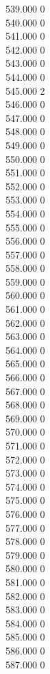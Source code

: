 { 539.000	0 \\
 540.000	0 \\
 541.000	0 \\
 542.000	0 \\
 543.000	0 \\
 544.000	0 \\
 545.000	2 \\
 546.000	0 \\
 547.000	0 \\
 548.000	0 \\
 549.000	0 \\
 550.000	0 \\
 551.000	0 \\
 552.000	0 \\
 553.000	0 \\
 554.000	0 \\
 555.000	0 \\
 556.000	0 \\
 557.000	0 \\
 558.000	0 \\
 559.000	0 \\
 560.000	0 \\
 561.000	0 \\
 562.000	0 \\
 563.000	0 \\
 564.000	0 \\
 565.000	0 \\
 566.000	0 \\
 567.000	0 \\
 568.000	0 \\
 569.000	0 \\
 570.000	0 \\
 571.000	0 \\
 572.000	0 \\
 573.000	0 \\
 574.000	0 \\
 575.000	0 \\
 576.000	0 \\
 577.000	0 \\
 578.000	0 \\
 579.000	0 \\
 580.000	0 \\
 581.000	0 \\
 582.000	0 \\
 583.000	0 \\
 584.000	0 \\
 585.000	0 \\
 586.000	0 \\
 587.000	0 \\
}
